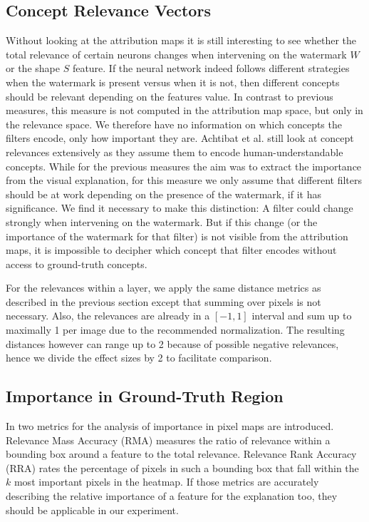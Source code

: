 \subsection{Concept Relevance Vectors}
Without looking at the attribution maps it is still interesting to see whether the total relevance of certain neurons changes when intervening on the watermark $W$ or the shape $S$ feature. If the neural network indeed follows different strategies when the watermark is present versus when it is not, then different concepts should be relevant depending on the features value. 
In contrast to previous measures, this measure is not computed in the attribution map space, but only in the relevance space. We therefore have no information on which concepts the filters encode, only how important they are. Achtibat et al. still look at concept relevances extensively as they assume them to encode human-understandable concepts. While for the previous measures the aim was to extract the importance from the visual explanation, for this measure we only assume that different filters should be at work depending on the presence of the watermark, if it has significance.
We find it necessary to make this distinction: A filter could change strongly when intervening on the watermark. But if this change (or the importance of the watermark for that filter) is not visible from the attribution maps, it is impossible to decipher which concept that filter encodes without access to ground-truth concepts. 

For the relevances within a layer, we apply the same distance metrics as described in the previous section except that summing over pixels is not necessary. Also, the relevances are already in a $[-1,1]$ interval and sum up to maximally 1 per image due to the recommended normalization. The resulting distances however can range up to 2 because of possible negative relevances, hence we divide the effect sizes by 2 to facilitate comparison. 

\subsection{Importance in Ground-Truth Region}\label{section:region_specific}
In \cite{Arras2022} two metrics for the analysis of importance in pixel maps are introduced. Relevance Mass Accuracy (RMA) measures the ratio of relevance within a bounding box around a feature to the total relevance. Relevance Rank Accuracy (RRA) rates the percentage of pixels in such a bounding box that fall within the $k$ most important pixels in the heatmap. If those metrics are accurately describing the relative importance of a feature for the explanation too, they should be applicable in our experiment. 

